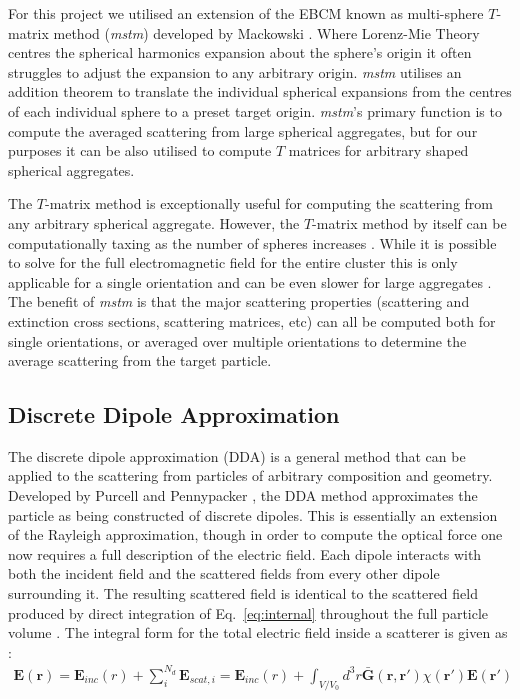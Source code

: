 For this project we utilised an extension of the EBCM known as 
multi-sphere $T$-matrix method (\textit{mstm}) developed by 
Mackowski \cite{Mackowski2011}. Where Lorenz-Mie Theory centres
the spherical harmonics expansion about the sphere's origin it
often struggles to adjust the expansion to any arbitrary origin.
\textit{mstm} utilises an addition theorem to translate the 
individual spherical expansions from the centres of each 
individual sphere to a preset target origin. \textit{mstm}'s 
primary function is to compute the averaged scattering from 
large spherical aggregates, but for our purposes it can be
also utilised to compute $T$ matrices for arbitrary shaped
spherical aggregates.

The $T$-matrix method is exceptionally useful for computing the 
scattering from any arbitrary spherical aggregate. However, the 
$T$-matrix method by itself can be computationally taxing as the 
number of spheres increases \cite{Mackowski2011}. While it is 
possible to solve for the full electromagnetic field for the 
entire cluster this is only applicable for a single orientation 
and can be even slower for large aggregates \cite{Mackowski1996, 
Xu1995}. The benefit of \textit{mstm} is that the major scattering 
properties (scattering and extinction cross sections, scattering 
matrices, etc) can all be computed both for single orientations, 
or averaged over multiple orientations to determine the average 
scattering from the target particle. 

\subsection{Discrete Dipole Approximation}
The discrete dipole approximation (DDA) is a general method that 
can be applied to the scattering from particles of arbitrary 
composition and geometry. Developed by Purcell and Pennypacker 
\cite{Purcell1973}, the DDA method approximates the particle as 
being constructed of discrete dipoles. This is essentially an 
extension of the Rayleigh approximation, though in order to compute 
the optical force one now requires a full description of the electric 
field. Each dipole interacts with both the incident field and the 
scattered fields from every other dipole surrounding it. The 
resulting scattered field is identical to the scattered field 
produced by direct integration of Eq.~\eqref{eq:internal} 
throughout the full particle volume \cite{Goedecke1988}. The 
integral form for the total electric field inside a scatterer is 
given as \cite{Wriedt1998}:
\begin{align}
	\mathbf{E(r)} = \mathbf{E}_{inc}(r) + \sum^{N_d}_{i}\mathbf{E}_{scat,i} =  
	\mathbf{E}_{inc}(r) + \int_{V/V_0}d^3r\mathbf{\bar{G}(r,r')}
	\chi(\mathbf{r'})\mathbf{E(r')}
	\label{eq:DDA}
\end{align}


